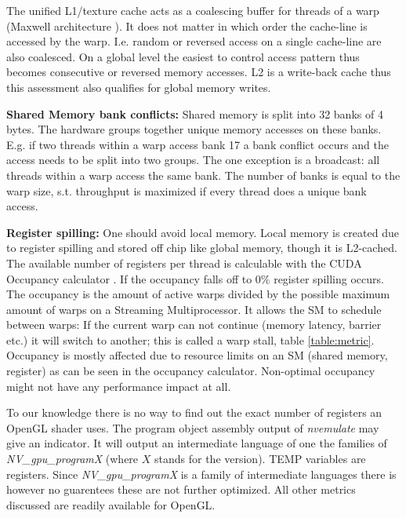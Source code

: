 \documentclass[m,times]{cgMA}
\begin{document}
The unified L1/texture cache acts as a coalescing buffer for threads of a warp (Maxwell architecture \cite{NVIDIA:MAXWELL}). It does not matter in which order the cache-line is accessed by the warp. I.e. random or reversed access on a single cache-line are also coalesced. On a global level the easiest to control access pattern thus becomes consecutive or reversed memory accesses. L2 is a write-back cache thus this assessment also qualifies for global memory writes. \cite{NVIDIA:MEMORY_BAND}


\textbf{Shared Memory bank conflicts:} Shared memory is split into 32 banks of 4 bytes. The hardware groups together unique memory accesses on these banks. E.g. if two threads within a warp access bank 17 a bank conflict occurs and the access needs to be split into two groups. The one exception is a broadcast: all threads within a warp access the same bank. The number of banks is equal to the warp size, s.t. throughput is maximized if every thread does a unique bank access. \cite{NVIDIA:BEST:PRACTICE}


\textbf{Register spilling:} One should avoid local memory. Local memory is created due to register spilling and stored off chip like global memory, though it is L2-cached. The available number of registers per thread is calculable with the CUDA Occupancy calculator \cite{NVIDIA:OCCUPANCY}. If the occupancy falls off to 0\% register spilling occurs. The occupancy is the amount of active warps divided by the possible maximum amount of warps on a Streaming Multiprocessor. It allows the SM to schedule between warps: If the current warp can not continue (memory latency, barrier etc.) it will switch to another; this is called a warp stall, table \ref{table:metric}. Occupancy is mostly affected due to resource limits on an SM (shared memory, register) as can be seen in the occupancy calculator. Non-optimal occupancy might not have any performance impact at all. \cite{NVIDIA:ACHIEVED_OCCUPANCY}

To our knowledge there is no way to find out the exact number of registers an OpenGL shader uses. The program object assembly output of \textit{nvemulate} \cite{NVIDIA:EMULATE} may give an indicator. It will output an intermediate language of one the families of \textit{NV\_gpu\_programX} (where $X$ stands for the version). TEMP variables are registers. Since \textit{NV\_gpu\_programX} is a family of intermediate languages there is however no guarentees these are not further optimized. All other metrics discussed are readily available for OpenGL.
\end{document}
